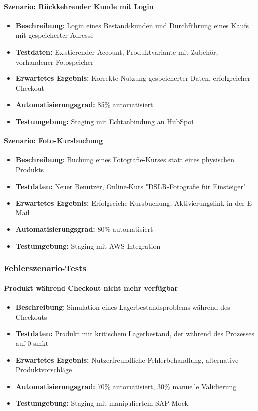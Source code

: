 \paragraph{Szenario: Rückkehrender Kunde mit Login}
\begin{itemize}
\item \textbf{Beschreibung:} Login eines Bestandskunden und Durchführung eines Kaufs mit gespeicherter Adresse
\item \textbf{Testdaten:} Existierender Account, Produktvariante mit Zubehör, vorhandener Fotospeicher
\item \textbf{Erwartetes Ergebnis:} Korrekte Nutzung gespeicherter Daten, erfolgreicher Checkout
\item \textbf{Automatisierungsgrad:} 85\% automatisiert
\item \textbf{Testumgebung:} Staging mit Echtanbindung an HubSpot
\end{itemize}
\paragraph{Szenario: Foto-Kursbuchung}
\begin{itemize}
\item \textbf{Beschreibung:} Buchung eines Fotografie-Kurses statt eines physischen Produkts
\item \textbf{Testdaten:} Neuer Benutzer, Online-Kurs "DSLR-Fotografie für Einsteiger"
\item \textbf{Erwartetes Ergebnis:} Erfolgreiche Kursbuchung, Aktivierungslink in der E-Mail
\item \textbf{Automatisierungsgrad:} 80\% automatisiert
\item \textbf{Testumgebung:} Staging mit AWS-Integration
\end{itemize}
\subsubsection{Fehlerszenario-Tests}
\paragraph{Produkt während Checkout nicht mehr verfügbar}
\begin{itemize}
\item \textbf{Beschreibung:} Simulation eines Lagerbestandsproblems während des Checkouts
\item \textbf{Testdaten:} Produkt mit kritischem Lagerbestand, der während des Prozesses auf 0 sinkt
\item \textbf{Erwartetes Ergebnis:} Nutzerfreundliche Fehlerbehandlung, alternative Produktvorschläge
\item \textbf{Automatisierungsgrad:} 70\% automatisiert, 30\% manuelle Validierung
\item \textbf{Testumgebung:} Staging mit manipuliertem SAP-Mock
\end{itemize}
